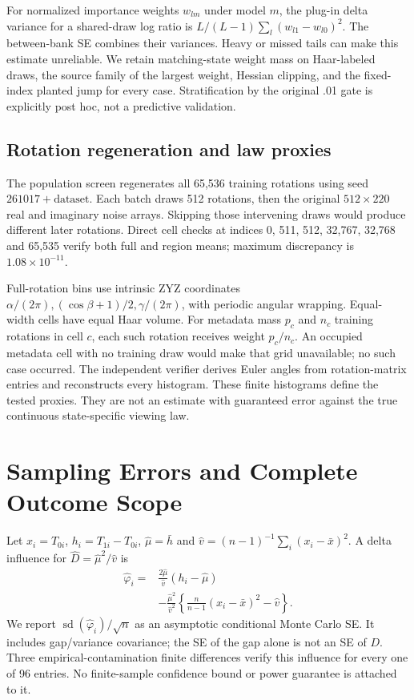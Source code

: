 For normalized importance weights $w_{lm}$ under model $m$, the plug-in
delta variance for a shared-draw log ratio is
$L/(L-1)\sum_l(w_{l1}-w_{l0})^2$. The between-bank SE combines their
variances. Heavy or missed tails can make this estimate unreliable. We
retain matching-state weight mass on Haar-labeled draws, the source family
of the largest weight, Hessian clipping, and the fixed-index planted jump
for every case. Stratification by the original .01 gate is explicitly
post hoc, not a predictive validation.

\subsection{Rotation regeneration and law proxies}
The population screen regenerates all 65,536 training rotations using seed
$261017+\text{dataset}$. Each batch draws 512 rotations, then the original
$512\times220$ real and imaginary noise arrays. Skipping those intervening
draws would produce different later rotations. Direct cell checks at
indices 0, 511, 512, 32,767, 32,768 and 65,535 verify both full and region
means; maximum discrepancy is $1.08\times10^{-11}$.

Full-rotation bins use intrinsic ZYZ coordinates
$\alpha/(2\pi),(\cos\beta+1)/2,\gamma/(2\pi)$, with periodic angular
wrapping. Equal-width cells have equal Haar volume. For metadata mass $p_c$
and $n_c$ training rotations in cell $c$, each such rotation receives weight
$p_c/n_c$. An occupied metadata cell with no training draw would make that
grid unavailable; no such case occurred. The independent verifier derives
Euler angles from rotation-matrix entries and reconstructs every histogram.
These finite histograms define the tested proxies. They are not an estimate
with guaranteed error against the true continuous state-specific viewing law.

\section{Sampling Errors and Complete Outcome Scope}\label{app:stats-new}
Let $x_i=T_{0i}$, $h_i=T_{1i}-T_{0i}$, $\widehat\mu=\bar h$ and
$\widehat v=(n-1)^{-1}\sum_i(x_i-\bar x)^2$. A delta influence for
$\widehat D=\widehat\mu^2/\widehat v$ is
\begin{align}
\widehat\varphi_i={}&\frac{2\widehat\mu}{\widehat v}(h_i-\widehat\mu)\\
&-\frac{\widehat\mu^2}{\widehat v^2}
\left\{\frac n{n-1}(x_i-\bar x)^2-\widehat v\right\}.\nonumber
\end{align}
We report $\operatorname{sd}(\widehat\varphi_i)/\sqrt n$ as an
asymptotic conditional Monte Carlo SE. It includes gap/variance covariance;
the SE of the gap alone is not an SE of $D$. Three empirical-contamination
finite differences verify this influence for every one of 96 entries.
No finite-sample confidence bound or power guarantee is attached to it.

